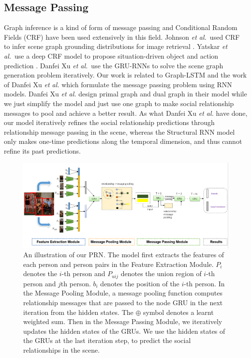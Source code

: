 \documentclass{article}
\newcommand{\PRN}{{\sf PRN}}
\newcommand{\etal}{{\it et al.}}
\begin{document}
\subsection{Message Passing}%
Graph inference is a kind of form of message passing and Conditional Random Fields (CRF) have been used extensively in this field. Johnson \etal \ used CRF to infer scene graph grounding distributions for image retrieval \cite{DBLP:conf/cvpr/JohnsonKSLSBL15}. Yatskar \etal \ use a deep CRF model to propose situation-driven object and action prediction\cite{DBLP:conf/cvpr/YatskarZF16} . Danfei Xu \etal \ use the GRU-RNNs to solve the scene graph generation problem iteratively\cite{DBLP:conf/cvpr/XuZCF17}. Our work is related to Graph-LSTM \cite{DBLP:conf/eccv/LiangSFLY16} and  the work of  Danfei Xu \etal \cite{DBLP:conf/cvpr/XuZCF17} which formulate the message passing problem using RNN models. Danfei Xu \etal \cite{DBLP:conf/cvpr/XuZCF17} design primal graph and dual graph in their model while we just simplify the model and just use one graph to make social relationship messages to pool and achieve a better result. As what Danfei Xu \etal \cite{DBLP:conf/cvpr/XuZCF17} have done, our model iteratively refines the social relationship predictions through relationship message passing in the scene, whereas the Structural RNN model only makes one-time predictions along the temporal dimension, and thus cannot refine its past predictions\cite{DBLP:conf/cvpr/XuZCF17}.
\vspace*{-3mm}
\begin{figure}[htpb]
	\centering
	\includegraphics[width=0.96 \textwidth,clip]{./pic/model_2.png}
	\caption{An illustration of our \PRN . The model first extracts the features of each person and person pairs in the Feature Extraction Module. $P_i$ denotes the $i$-th person and $P_{uij}$ denotes the union region of $i$-th person and $j$th person. $b_i$ denotes the position of the $i$-th person. In the Message Pooling Module, a message pooling function computes relationship messages that are passed to the node GRU in the next iteration from the hidden states. The $\oplus$ symbol denotes a learnt weighted sum. Then in the Message Passing Module, we iteratively updates the hidden states of the GRUs. We use the hidden states of the GRUs at the last iteration step, to predict the social relationships in the scene.}
	\vspace*{-3.5mm}
	\label{fig:model}
\end{figure}
\end{document}
